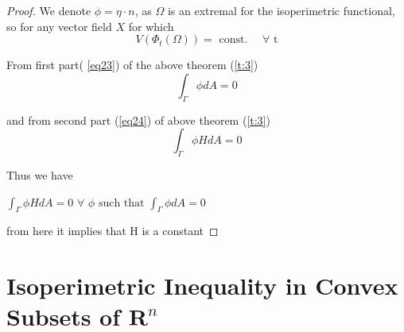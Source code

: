 \documentclass[oneside]{book}
\begin{document}
	\begin{proof} 
		
		
		
		We denote 
		$\phi = \eta\cdot{n}$,
		as $\Omega$ is an extremal for the isoperimetric functional, so for any vector field $X$ for which
		\[
		V\left(\Phi_{t}(\Omega)\right)=\text { const. } \quad \forall \text{ t}
		\]
		
		From first part( \ref{eq23}) of the above theorem (\ref{t:3}) \\ 
		
		$$\int_{\Gamma} \phi d A=0$$
		
		
		and from second part (\ref{eq24}) of above theorem (\ref{t:3})
		$$\int_{\Gamma} \phi H d A=0$$
		
		Thus we have \\
		
		\begin{center}
			$ \int_{\Gamma} \phi H d A=0 \hspace{4pt} \forall  \hspace{4pt}\phi \text { such that } \int_{\Gamma} \phi d A=0$ \\ 
		\end{center}
		from here it implies that H is a constant 
	\end{proof}
	\chapter{Isoperimetric Inequality in Convex Subsets of $\mathbf{R}^{n}$ }
	\label{chap:c4}
	
	
	
	
	
	
	
	
	
	
	
	
	
	
	
	
	
	
	
	
	
	
	
	
	
	
	
	
	
	
	
	
	
	
	
	
	
	
	
	
\end{document}
